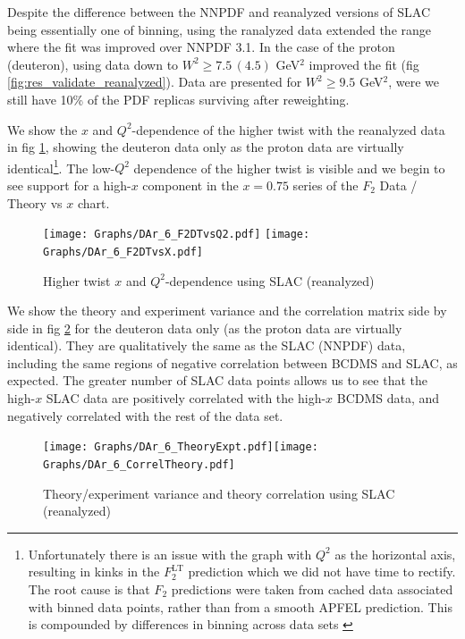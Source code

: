 \documentclass[12pt,a4paper]{report}
\begin{document}
Despite the difference between the NNPDF and reanalyzed versions of SLAC being essentially one of binning, using the ranalyzed data extended the range where the fit was improved over NNPDF 3.1. In the case of the proton (deuteron), using data down to $W^2 \ge 7.5 \, (4.5)$ GeV$^2$ improved the fit (fig \ref{fig:res_validate_reanalyzed}). Data are presented for $W^2 \ge 9.5$ GeV$^2$, were we still have 10\% of the PDF replicas surviving after reweighting.

We show the $x$ and $Q^2$-dependence of the higher twist with the reanalyzed data in fig \ref{fig:res_ht_XQ2_Dep_SLAC_reanalyzed}, showing the deuteron data only as the proton data are virtually identical\footnote{Unfortunately there is an issue with the graph with $Q^2$ as the horizontal axis, resulting in kinks in the $F_2^\textrm{LT}$ prediction which we did not have time to rectify. The root cause is that $F_2$ predictions were taken from cached data associated with binned data points, rather than from a smooth APFEL prediction. This is compounded by differences in binning across data sets \cite[pg 503]{Milsztajn:Data}}. The low-$Q^2$ dependence of the higher twist is visible and we begin to see support for a high-$x$ component in the $x=0.75$ series of the $F_2$ Data / Theory vs $x$ chart.

\begin{figure}[H]
\begin{center}
\texttt{[image: Graphs/DAr\_6\_F2DTvsQ2.pdf]}
\texttt{[image: Graphs/DAr\_6\_F2DTvsX.pdf]}
\caption{Higher twist $x$ and $Q^2$-dependence using SLAC (reanalyzed)}
\label{fig:res_ht_XQ2_Dep_SLAC_reanalyzed}
\end{center}
\end{figure}

We show the theory and experiment variance and the correlation matrix side by side in fig \ref{fig:res_theory_exp_reanalyzed} for the deuteron data only (as the proton data are virtually identical). They are qualitatively the same as the SLAC (NNPDF) data, including the same regions of negative correlation between BCDMS and SLAC, as expected. The greater number of SLAC data points allows us to see that the high-$x$ SLAC data are positively correlated with the high-$x$ BCDMS data, and negatively correlated with the rest of the data set.
\begin{figure}[H]
\begin{center}
\texttt{[image: Graphs/DAr\_6\_TheoryExpt.pdf]}\texttt{[image: Graphs/DAr\_6\_CorrelTheory.pdf]}
\caption{Theory/experiment variance and theory correlation using SLAC (reanalyzed)}
\label{fig:res_theory_exp_reanalyzed}
\end{center}
\end{figure}
\end{document}
